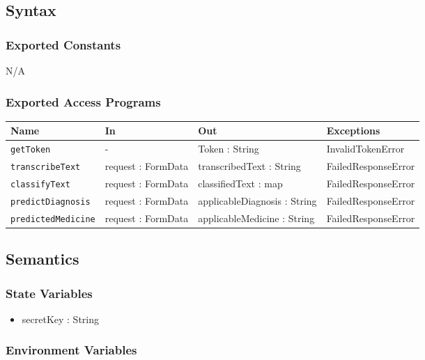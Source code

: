 \documentclass[12pt, titlepage]{article}
\begin{document}
\subsection{Syntax}

\subsubsection{Exported Constants}
N/A

\subsubsection{Exported Access Programs}

\begin{center}
\begin{tabular}{p{3cm} p{4cm} p{4cm} p{3.5cm}}
\hline
\textbf{Name} & \textbf{In} & \textbf{Out} & \textbf{Exceptions} \\
\hline
\texttt{getToken} & - & Token : String & InvalidTokenError \\
\texttt{transcribeText} & request : FormData & transcribedText : String & FailedResponseError \\
\texttt{classifyText} & request : FormData & classifiedText : map  & FailedResponseError \\
\texttt{predictDiagnosis} & request : FormData & applicableDiagnosis : String & FailedResponseError \\
\texttt{predictedMedicine} & request : FormData & applicableMedicine : String & FailedResponseError \\
\hline
\end{tabular}
\end{center}

\subsection{Semantics}

\subsubsection{State Variables}

\begin{itemize}
  \item secretKey : String 
\end{itemize}

\subsubsection{Environment Variables}
\end{document}
